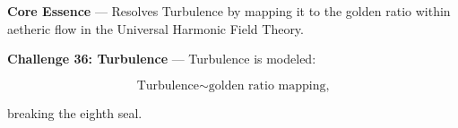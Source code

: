 
\textbf{Core Essence} --- Resolves Turbulence by mapping it to the golden ratio within aetheric flow in the Universal Harmonic Field Theory.

\textbf{Challenge 36: Turbulence} --- Turbulence is modeled:

$$
\text{Turbulence} \sim \text{golden ratio mapping,}
$$

breaking the eighth seal.

